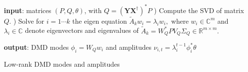 \documentclass{article}
\newcommand{\Rr}{\mathds{R}}
\newcommand{\Cr}{\mathds{C}}
\newcommand{\R}{P}
\newcommand{\Q}{Q}
\newcommand{\AAA}{\mathbf{X}}
\newcommand{\BBB}{\mathbf{Y}}
\newcommand{\ie}{\textit{i.e.}, }
\def\remCH#1{{\noindent\color{red}{{\footnotesize [CH: #1]}}}}
\begin{document}
 
\begin{algorithm}[t]
\begin{algorithmic}[0]
\State \textbf{input}: matrices $(\R, \Q,\theta)$, with $\Q= (\BBB\AAA^{\dagger})^* \R$
) Compute the SVD of matrix  $\Q$.%
) Solve for $ i=1 \cdots k$ the eigen equation $ \tilde A_k w_i = \lambda_i w_i, $ where  $w_i \in \Cr^m$ and  $\lambda_i \in \Cr$ denote eigenvectors and eigenvalues of $\tilde  A_k=W_{\Q}^*\R V_{\Q}\Sigma_{\Q} \in \Rr^{m\times m}.$


\State \textbf{output}: DMD modes $  \phi_i=W_{\Q} w_i$ and amplitudes $\nu_{i,t} =  \lambda_i^{t-1} \phi_i^*\theta$%
\end{algorithmic}
\caption{Low-rank DMD modes and amplitudes \label{algo:2}}
\end{algorithm}
\end{document}
